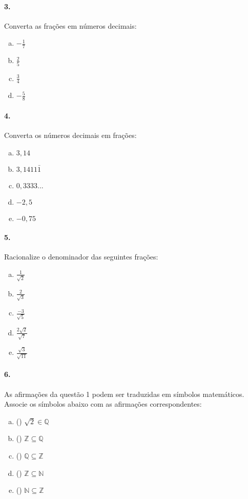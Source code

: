 \documentclass[a4paper,twocolumn,12pt]{article}
\begin{document}
\paragraph*{3. } Converta as frações em números decimais:
\begin{enumerate}[a)]
  \item $\displaystyle-\frac{1}{7}$
  \item $\displaystyle\frac{2}{5}$
  \item $\displaystyle\frac{3}{4}$
  \item $\displaystyle-\frac{5}{8}$
\end{enumerate}

\paragraph*{4. } Converta os números decimais em frações:
\begin{enumerate}[a)]
  \item $3,14$
  \item $3,1411\bar{1}$
  \item $0,3333...$
  \item $-2,5$
  \item $-0,75$
\end{enumerate}


\paragraph*{5. } Racionalize o denominador das seguintes frações:
\begin{enumerate}[a)]
  \item $\displaystyle\frac{1}{\sqrt{2}}$
  \item $\displaystyle\frac{2}{\sqrt{3}}$
  \item $\displaystyle\frac{-3}{\sqrt{5}}$
  \item $\displaystyle\frac{2\sqrt{2}}{\sqrt{7}}$
  \item $\displaystyle\frac{\sqrt{3}}{\sqrt{11}}$
  \end{enumerate}

\paragraph*{6. } As afirmações da questão 1 podem ser traduzidas em símbolos matemáticos. Associe os símbolos abaixo com as afirmações correspondentes:
\begin{enumerate}[a)]
  \item (\hspace{7mm}) $\sqrt{2} \in \mathbb{Q}$ 
  \item (\hspace{7mm}) $\mathbb{Z} \subseteq \mathbb{Q}$
  \item (\hspace{7mm}) $\mathbb{Q} \subseteq \mathbb{Z}$
  \item (\hspace{7mm}) $\mathbb{Z} \subseteq \mathbb{N}$
  \item (\hspace{7mm}) $\mathbb{N} \subseteq \mathbb{Z}$
\end{enumerate}
\end{document}
